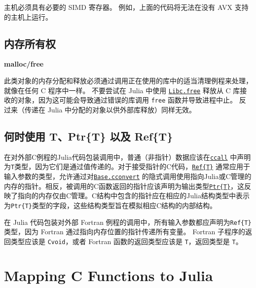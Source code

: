 主机必须具有必要的 SIMD 寄存器。 例如，上面的代码将无法在没有 AVX 支持的主机上运行。



\hypertarget{10794774929021837783}{}


\subsection{内存所有权}



\textbf{malloc/free}



此类对象的内存分配和释放必须通过调用正在使用的库中的适当清理例程来处理，就像在任何 C 程序中一样。 不要尝试在 Julia 中使用 \hyperlink{1633533624062187737}{\texttt{Libc.free}} 释放从 C 库接收的对象，因为这可能会导致通过错误的库调用 \texttt{free} 函数并导致进程中止。 反过来（传递在 Julia 中分配的对象以供外部库释放）同样无效。



\hypertarget{13734604265364549635}{}


\subsection{何时使用 T、Ptr\{T\} 以及 Ref\{T\}}



在对外部C例程的Julia代码包装调用中，普通（非指针）数据应该在\hyperlink{14245046751182637566}{\texttt{ccall}} 中声明为\texttt{T}类型，因为它们是通过值传递的。对于接受指针的C代码，\hyperlink{7936024700322877457}{\texttt{Ref\{T\}}} 通常应用于输入参数的类型，允许通过对\hyperlink{16487788729383051927}{\texttt{Base.cconvert}} 的隐式调用使用指向Julia或C管理的内存的指针。相反，被调用的C函数返回的指针应该声明为输出类型\hyperlink{10630331440513004826}{\texttt{Ptr\{T\}}}，这反映了指向的内存仅由C管理。C结构中包含的指针应在相应的Julia结构类型中表示为\texttt{Ptr\{T\}}类型的字段，这些结构类型旨在模拟相应C结构的内部结构。



在 Julia 代码包装对外部 Fortran 例程的调用中，所有输入参数都应声明为\texttt{Ref\{T\}}类型，因为 Fortran 通过指向内存位置的指针传递所有变量。 Fortran 子程序的返回类型应该是 \texttt{Cvoid}，或者 Fortran 函数的返回类型应该是 \texttt{T}，返回类型是 \texttt{T}。



\hypertarget{6114319820079574946}{}


\section{Mapping C Functions to Julia}



